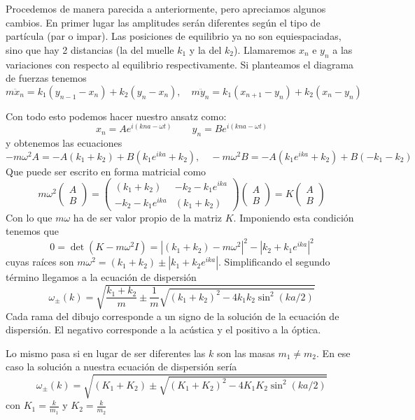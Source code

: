 \documentclass[leqno]{article}
\begin{document}
Procedemos de manera parecida a anteriormente, pero apreciamos algunos cambios. En primer lugar las amplitudes serán diferentes según el tipo de partícula (par o impar). Las posiciones de equilibrio ya no son equiespaciadas, sino que hay 2 distancias (la del muelle $k_1$ y la del $k_2$). Llamaremos $x_n$ e  $y_n$ a las variaciones con respecto al equilibrio respectivamente. Si planteamos el diagrama de fuerzas tenemos
\[
m\ddot{x}_n = k_1(y_{n-1}-x_n)+k_2(y_n-x_n), \quad 
m\ddot{y}_n = k_1(x_{n+1}-y_n)+k_2(x_n-y_n)
\] 

Con todo esto podemos hacer nuestro ansatz como:
\[
x_n = A e^{i(kna-\omega t)} \qquad
y_n = B e^{i(kna-\omega t)}
\] 
y obtenemos las ecuaciones
\[
-m\omega ^2 A = -A(k_1+k_2)+ B(k_1e^{ika}+k_2), \quad 
-m\omega ^2 B = -A(k_1e^{ika}+k_2)+ B(-k_1-k_2)
\] 
Que puede ser escrito en forma matricial como
\[
  m\omega ^2 \begin{pmatrix} A\\B \end{pmatrix} = \begin{pmatrix} (k_1+k_2) & -k_2 -k_1e^{ika} \\ -k_2-k_1e^{ika} & (k_1+k_2) \end{pmatrix}  \begin{pmatrix} A\\B \end{pmatrix} = K\begin{pmatrix} A\\B \end{pmatrix} 
\] 
Con lo que $m\omega $ ha de ser valor propio de la matriz $K$. Imponiendo esta condición tenemos que
 \[
0 = \det(K-m\omega ^2I) = |(k_1+k_2)-m\omega ^2|^2 - |k_2 +k_1e^{ika}|^2
\] 
cuyas raíces son $m\omega^2 = (k_1+k_2) \pm |k_1+k_2e^{ika}|$. Simplificando el segundo término llegamos a la ecuación de dispersión 
\[
  \boxed{\omega _{\pm}(k) = \sqrt{ \frac{k_1+k_2}{m}\pm \frac{1}{m} \sqrt{(k_1+k_2)^2-4k_1k_2\sin^2(ka / 2)} } }
\] 
Cada rama del dibujo corresponde a un signo de la solución de la ecuación de dispersión. El negativo corresponde a la acústica y el positivo a la óptica.

Lo mismo pasa si en lugar de ser diferentes las $k$ son las masas  $m_1\neq m_2$. En ese caso la solución a nuestra ecuación de dispersión sería
\[
  \boxed{\omega _{\pm}(k) = \sqrt{ (K_1+K_2)\pm \sqrt{(K_1+K_2)^2-4K_1K_2\sin^2(ka / 2)} } }
\] 
con $K_1= \frac{k}{m_1}$ y $K_2 = \frac{k}{m_2}$
\end{document}
